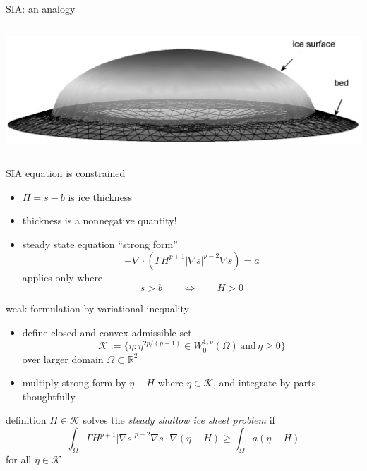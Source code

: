 \documentclass[hide notes,intlimits]{beamer}
\newcommand{\RR}{\mathbb{R}}
\newcommand{\Kcal}{\mathcal{K}}
\newcommand{\Div}{\nabla\cdot}
\newcommand{\grad}{\nabla}
\begin{document}
\begin{frame}{SIA: an analogy}
\begin{columns}
\begin{column}{0.55\textwidth}
\begin{center}
\vspace{10mm}
\includegraphics[width=1.05\textwidth]{capnonflatobs}
\end{center}
\end{column}
\end{columns}
\end{frame}


\begin{frame}{SIA equation is constrained} 
\begin{itemize}
\item $H=s-b$ is ice thickness
\item thickness is a nonnegative quantity!
\item steady state equation ``strong form''
  $$-\Div \left(\Gamma H^{p+1} |\nabla s|^{p-2} \nabla s  \right) =  a$$
applies only where
  $$s>b \qquad \iff \qquad H > 0$$
\end{itemize}
\end{frame}


\begin{frame}{weak formulation by variational inequality} 
\begin{itemize}
\item define closed and convex admissible set
  $$\Kcal := \{\eta : \eta^{2p/(p-1)} \in W^{1,p}_0 (\Omega) \,\text{and}\, \eta \ge 0\}$$
over larger domain $\Omega \subset \RR^2$
\item multiply strong form by $\eta-H$ where $\eta\in \Kcal$, and integrate by parts thoughtfully
\end{itemize}
\begin{block}{definition} 
$H \in \Kcal$ solves the \emph{steady shallow ice sheet problem} if
  $$\int_{\Omega}  \Gamma H^{p+1} |\grad s|^{p-2} \grad s \cdot \grad(\eta - H)  
\ge \int_{\Omega} a (\eta - H)$$
for all $\eta \in \Kcal$
\end{block}
\end{frame}
\end{document}
